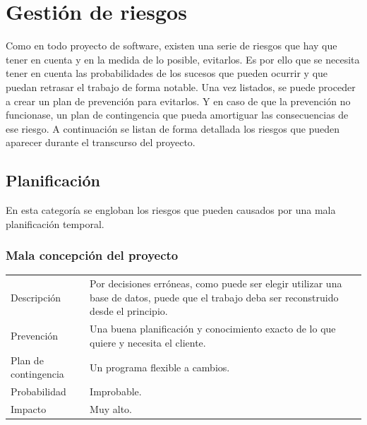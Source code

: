 \section{Gesti\'{o}n de riesgos}
Como en todo proyecto de software, existen una serie de riesgos que hay que tener en cuenta y en 
la medida de lo posible,
evitarlos. Es por ello que se necesita tener en cuenta las probabilidades de los sucesos que 
pueden ocurrir y que puedan retrasar el trabajo de forma notable. Una vez
listados, se puede proceder a crear un plan de prevención para evitarlos. Y en caso de que la 
prevenci\'on no
funcionase, un plan de contingencia que pueda amortiguar las consecuencias de ese riesgo. A 
continuación
se listan de forma detallada los riesgos que pueden aparecer durante el transcurso del proyecto.

\subsection{Planificaci\'{o}n}
En esta categor\'{i}a se engloban los riesgos que pueden causados por una mala planificaci\'{o}n 
temporal.
\subsubsection{Mala concepci\'{o}n del proyecto}
\begin{table}[H]
    \begin{center}
       \begin{tabular}{l p{8cm}}
           Descripci\'{o}n                 & Por decisiones erróneas, como puede ser elegir 
           utilizar una
           base de datos, puede que el trabajo deba ser reconstruido desde el principio. \\
           Prevenci\'{o}n                  & Una buena planificación y conocimiento exacto de lo 
           que quiere y necesita el cliente. 
           									  \\ 
           Plan de contingencia            & Un programa flexible a cambios. \\
           Probabilidad                    & Improbable. \\
           Impacto                         & Muy alto. \\
        \end{tabular}
    \end{center}
    
\end{table}
